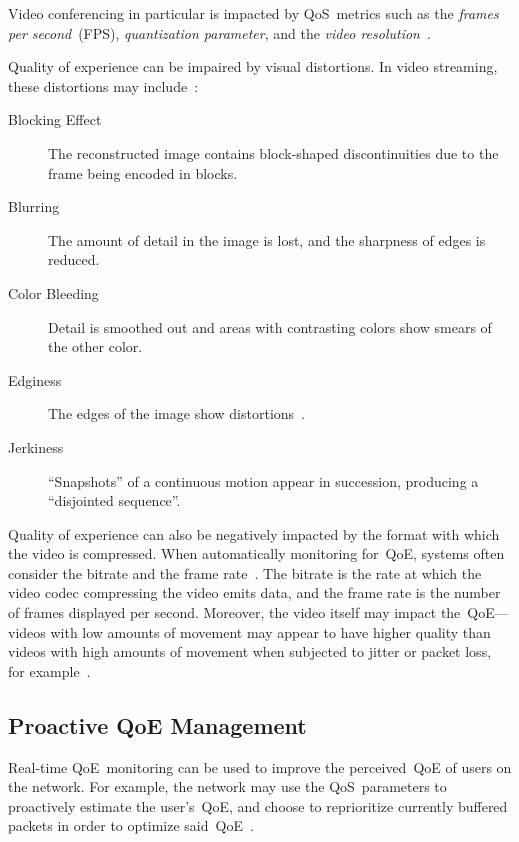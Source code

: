         Video conferencing in particular is impacted by QoS~metrics such as the \emph{frames per second}~(FPS), \emph{quantization parameter}, and the \emph{video resolution}~\autocite{MacMillanKyle2021MtPa}.

        Quality of experience can be impaired by visual distortions. In video streaming, these distortions may include~\autocite{YuenMichael1998Asoh}:

        \begin{description}
            \item[Blocking Effect] The reconstructed image contains block-shaped discontinuities due to the frame being encoded in blocks.
            \item[Blurring] The amount of detail in the image is lost, and the sharpness of edges is reduced.
            \item[Color Bleeding] Detail is smoothed out and areas with contrasting colors show smears of the other color.
            \item[Edginess] The edges of the image show distortions~\autocite{ChenYanjiao2015FQtQ}.
            \item[Jerkiness] \enquote{Snapshots} of a continuous motion appear in succession, producing a \enquote{disjointed sequence}.
        \end{description}

        Quality of experience can also be negatively impacted by the format with which the video is compressed. When automatically monitoring for~QoE, systems often consider the bitrate and the frame rate~\autocite{ChenYanjiao2015FQtQ}. The bitrate is the rate at which the video codec compressing the video emits data, and the frame rate is the number of frames displayed per second. Moreover, the video itself may impact the~QoE---videos with low amounts of movement may appear to have higher quality than videos with high amounts of movement when subjected to jitter or packet loss, for example~\autocite{ChenYanjiao2015FQtQ}.


    \subsection{Proactive QoE Management}\label{introduction:applications:management}
        Real-time QoE~monitoring can be used to improve the perceived~QoE of users on the network. For example, the network may use the QoS~parameters to proactively estimate the user's~QoE, and choose to reprioritize currently buffered packets in order to optimize said~QoE~\autocite{DinakiHosseinEbrahimi2021FVQW}.


